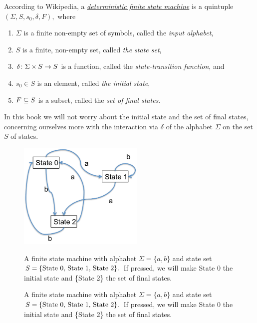 \documentclass[CT4S-EN-RU]{subfiles}
\begin{document}
\begin{blockENG}
According to Wikipedia, a \href{http://en.wikipedia.org/wiki/Finite_state_machine#Mathematical_model}{\em deterministic finite state machine} is a quintuple $(\Sigma,S,s_0,\delta,F),$ where
\begin{enumerate}
\item $\Sigma$ is a finite non-empty set of symbols, called the {\em input alphabet},
\item $S$ is a finite, non-empty set, called {\em the state set},
\item $\delta\taking \Sigma\times S\to S$ is a function, called the {\em state-transition function}, and
\item $s_0\in S$ is an element, called {\em the initial state},
\item $F\ss S$ is a subset, called the {\em set of final states}.
\end{enumerate}
\end{blockENG}

\begin{blockRUS}
\end{blockRUS}

\begin{blockENG}
In this book we will not worry about the initial state and the set of final states, concerning ourselves more with the interaction via $\delta$ of the alphabet $\Sigma$ on the set $S$ of states.
\end{blockENG}

\begin{blockRUS}
\end{blockRUS}

\begin{figure}[h]
\begin{center}
\includegraphics[height=2in]{FSM1}
\end{center}
\begin{blockENG}
\caption{A finite state machine with alphabet $\Sigma=\{a,b\}$ and state set $S=\{\tn{State 0, State 1, State 2}\}.$ If pressed, we will make State 0 the initial state and \{State 2\} the set of final states.}\label{fig:fsa}
\end{blockENG}
\begin{blockRUS}
\caption{A finite state machine with alphabet $\Sigma=\{a,b\}$ and state set $S=\{\tn{State 0, State 1, State 2}\}.$ If pressed, we will make State 0 the initial state and \{State 2\} the set of final states.}\label{fig:fsa}
\end{blockRUS}
\end{figure}
\end{document}
